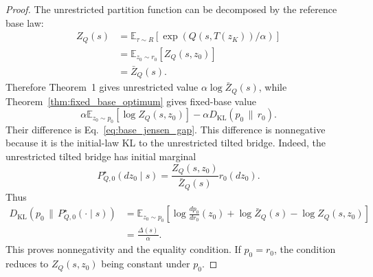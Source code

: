 \documentclass[11pt]{article}
\begin{document}
\begin{proof}
The unrestricted partition function can be decomposed by the reference base law:
\begin{align}
  Z_Q(s)
  &=
  \mathbb E_{\tau\sim R}
  \left[
    \exp(Q(s,T(z_K))/\alpha)
  \right]
  \nonumber\\
  &=
  \mathbb E_{z_0\sim r_0}
  \left[
    Z_Q(s,z_0)
  \right]
  \nonumber\\
  &=
  \bar Z_Q(s).
\end{align}
Therefore Theorem~1 gives unrestricted value $\alpha\log \bar Z_Q(s)$, while Theorem~\ref{thm:fixed_base_optimum} gives fixed-base value
\begin{equation}
  \alpha
  \mathbb E_{z_0\sim p_0}
  \left[
    \log Z_Q(s,z_0)
  \right]
  -
  \alpha
  D_{\mathrm{KL}}
  \left(
    p_0
    \,\|\,
    r_0
  \right).
\end{equation}
Their difference is Eq.~\eqref{eq:base_jensen_gap}. This difference is nonnegative because it is the initial-law KL to the unrestricted tilted bridge. Indeed, the unrestricted tilted bridge has initial marginal
\begin{equation}
  P_{Q,0}^\star(dz_0\mid s)
  =
  \frac{
    Z_Q(s,z_0)
  }{
    \bar Z_Q(s)
  }
  r_0(dz_0).
\end{equation}
Thus
\begin{align}
  D_{\mathrm{KL}}
  \left(
    p_0
    \,\|\,
    P_{Q,0}^\star(\cdot\mid s)
  \right)
  &=
  \mathbb E_{z_0\sim p_0}
  \left[
    \log
    \frac{
      dp_0
    }{
      dr_0
    }(z_0)
    +
    \log \bar Z_Q(s)
    -
    \log Z_Q(s,z_0)
  \right]
  \nonumber\\
  &=
  \frac{
    \Delta(s)
  }{
    \alpha
  }.
\end{align}
This proves nonnegativity and the equality condition. If $p_0=r_0$, the condition reduces to $Z_Q(s,z_0)$ being constant under $p_0$.


\end{proof}
\end{document}
